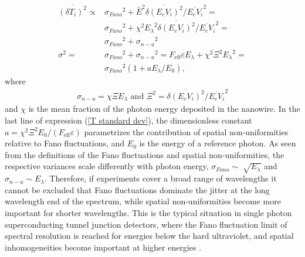 \documentclass[%
reprint,
 amsmath,amssymb,
aps,
pra,
]{revtex4-1}
\begin{document}
\begin{equation}\label{T standard dev}
\begin{aligned}
\overline{\left(\delta T_i\right)^2} \propto {}& {\sigma_{Fano}}^2 + \bar{E}^2\overline{\delta\left(E_cV_i\right)^2}/ \overline{E_cV_i}^2 = \\
&{\sigma_{Fano}}^2 + \chi^2{E_\lambda}^2\overline{\delta\left(E_cV_i\right)^2}/ \overline{E_cV_i}^2 = \\
&{\sigma_{Fano}}^2 + {\sigma_{n-u}}^2 \\
{\sigma}^2 ={}& {\sigma_{Fano}}^2 + {\sigma_{n-u}}^2 = F_{\text{eff}}\varepsilon E_\lambda + \chi^2\Xi^2{E_\lambda}^2 = \\
&{\sigma_{Fano}}^2 \left(1 + a E_\lambda / E_{0} \right),
\end{aligned}
\end{equation}
where
\begin{equation}\label{n-u}
\begin{aligned}
\sigma_{n-u} = \chi\Xi{E_\lambda} \text{ and } \Xi^2 = \overline{\delta\left(E_cV_i\right)^2}/ \overline{E_cV_i}^2 
\end{aligned}
\end{equation}
and \(\chi\) is the mean fraction of the photon energy deposited in the nanowire. In the last line of expression (\ref{T standard dev}), the dimensionless constant \(a = \chi^2\Xi^2E_0/(F_{\text{eff}}\varepsilon)\) parametrizes the contribution of spatial non-uniformities relative to Fano fluctuations, and $E_{0}$ is the energy of a reference photon. As seen from the definitions of the Fano fluctuations \cite{kozorezov_fano_2017} and spatial non-uniformities, the respective variances scale differently with photon energy, \(\sigma_{Fano}\sim\sqrt[]{E_\lambda} \) and \(\sigma_{n-u}\sim{E_\lambda}\). Therefore, if experiments cover a broad range of wavelengths it cannot be excluded that Fano fluctuations dominate the jitter at the long wavelength end of the spectrum, while spatial non-uniformities become more important for shorter wavelengths.  This is the typical situation in single photon superconducting tunnel junction detectors, where the Fano fluctuation limit of spectral resolution is reached for energies below the hard ultraviolet, and spatial inhomogeneities become important at higher energies \cite{kozorezov_electron_2007}.
\end{document}
